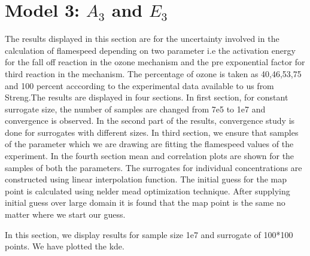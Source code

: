 \section{Model 3: $A_3$ and $E_3$}

The results displayed in this section are for the uncertainty involved in the calculation of flamespeed depending  on two parameter i.e the activation energy for the fall off reaction in the ozone mechanism and the pre exponential factor for third reaction in the mechanism. The percentage of ozone is taken as 40,46,53,75 and 100  percent acccording to the experimental data available to us from Streng\cite{Streng}.The results are displayed in four sections. In first section, for constant surrogate size, the number of samples are changed from 7e5 to 1e7 and convergence is observed. In the second part of the results, convergence study is done for surrogates with different sizes. In third section, we ensure that samples of the parameter which we are drawing are fitting the flamespeed values of the experiment. In the fourth section mean and correlation plots are shown for the samples of both the parameters. The surrogates for individual concentrations are constructed using linear interpolation function. The initial guess for the map point is calculated using nelder mead optimization technique. After supplying initial guess over large domain it is found that the map point is the same no matter where we start our guess. 


 In this section, we display results for sample size 1e7 and surrogate of 100*100 points. We  have plotted the kde. 

